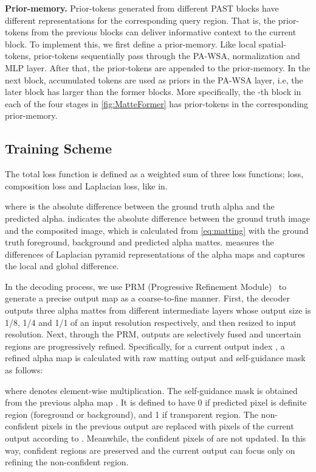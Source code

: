 \documentclass[10pt,twocolumn,letterpaper]{article}
\begin{document}
\textbf{Prior-memory.}
Prior-tokens generated from different PAST blocks have different representations for the corresponding query region. That is, the prior-tokens from the previous blocks can deliver informative context to the current block. To implement this, we first define a prior-memory. Like local spatial-tokens, prior-tokens sequentially pass through the PA-WSA, normalization and MLP layer. After that, the prior-tokens are appended to the prior-memory. In the next block, accumulated tokens are used as priors in the PA-WSA layer, i.e, the later block has larger  than the former blocks. 
More specifically, the -th block in each of the four stages in \cref{fig:MatteFormer} has  prior-tokens in the corresponding prior-memory.

\subsection{Training Scheme}
\label{sec:Training}

The total loss function is defined as a weighted sum of three loss functions;  loss, composition loss\cite{xu2017deep} and Laplacian loss\cite{hou2019context}, like in\cite{yu2021mask}.

where  is the absolute difference between the ground truth alpha and the predicted alpha.  indicates the absolute difference between the ground truth image and the composited image, which is calculated from \cref{eq:matting} with the ground truth foreground, background and predicted alpha mattes.  measures the differences of Laplacian pyramid representations of the alpha maps and captures the local and global difference. 

In the decoding process, we use PRM (Progressive Refinement Module)~\cite{yu2021mask} to generate a precise output map as a coarse-to-fine manner.
First, the decoder outputs three alpha mattes from different intermediate layers whose output size is 1/8, 1/4 and 1/1 of an input resolution respectively, and then resized to input resolution.
Next, through the PRM, outputs are selectively fused and uncertain regions are progressively refined. Specifically, for a current output index , a refined alpha map  is calculated with raw matting output  and self-guidance mask  as follows:


where  denotes element-wise multiplication.
The self-guidance mask  is obtained from the previous alpha map .
It is defined to have 0 if predicted pixel is definite region (foreground or background), and 1 if transparent region.
The non-confident pixels in the previous output  are replaced with pixels of the current output  according to . Meanwhile, the confident pixels of  are not updated.
In this way, confident regions are preserved and the current output can focus only on refining the non-confident region. 
\end{document}
